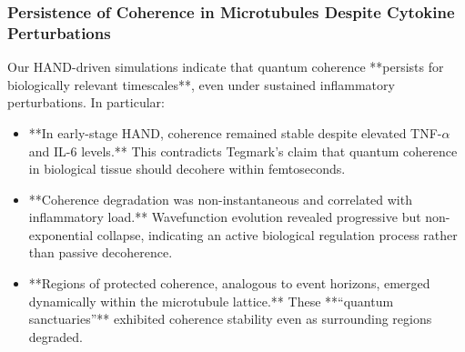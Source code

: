 \documentclass[entropy,article,submit,oneauthor,pdftex,]{Definitions/mdpi}
\begin{document}
\subsubsection{Persistence of Coherence in Microtubules Despite Cytokine Perturbations}
Our HAND-driven simulations indicate that quantum coherence **persists for biologically relevant timescales**, even under sustained inflammatory perturbations. In particular:
\begin{itemize}
    \item **In early-stage HAND, coherence remained stable despite elevated TNF-$\alpha$ and IL-6 levels.** This contradicts Tegmark’s claim that quantum coherence in biological tissue should decohere within femtoseconds.
    \item **Coherence degradation was non-instantaneous and correlated with inflammatory load.** Wavefunction evolution revealed progressive but non-exponential collapse, indicating an active biological regulation process rather than passive decoherence.
    \item **Regions of protected coherence, analogous to event horizons, emerged dynamically within the microtubule lattice.** These **“quantum sanctuaries”** exhibited coherence stability even as surrounding regions degraded.
\end{itemize}
\end{document}
